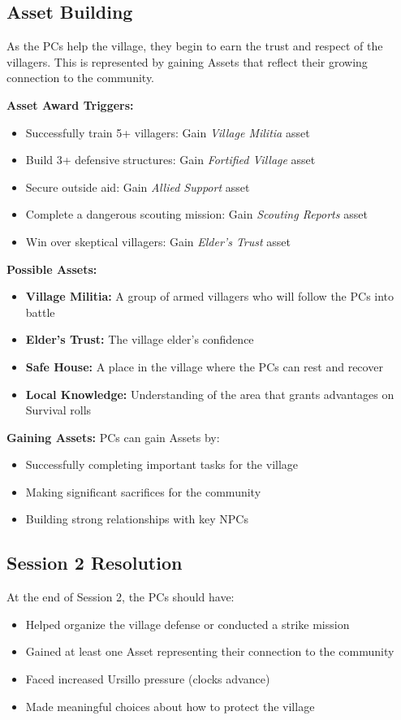 \documentclass[11pt]{article}
\begin{document}
\subsection{Asset Building}

As the PCs help the village, they begin to earn the trust and respect of the villagers. This is represented by gaining Assets that reflect their growing connection to the community.

\textbf{Asset Award Triggers:}
\begin{itemize}
\item Successfully train 5+ villagers: Gain \textit{Village Militia} asset
\item Build 3+ defensive structures: Gain \textit{Fortified Village} asset  
\item Secure outside aid: Gain \textit{Allied Support} asset
\item Complete a dangerous scouting mission: Gain \textit{Scouting Reports} asset
\item Win over skeptical villagers: Gain \textit{Elder's Trust} asset
\end{itemize}

\textbf{Possible Assets:}
\begin{itemize}
\item \textbf{Village Militia:} A group of armed villagers who will follow the PCs into battle
\item \textbf{Elder's Trust:} The village elder's confidence
\item \textbf{Safe House:} A place in the village where the PCs can rest and recover
\item \textbf{Local Knowledge:} Understanding of the area that grants advantages on Survival rolls
\end{itemize}

\textbf{Gaining Assets:} PCs can gain Assets by:
\begin{itemize}
\item Successfully completing important tasks for the village
\item Making significant sacrifices for the community
\item Building strong relationships with key NPCs
\end{itemize}

\subsection{Session 2 Resolution}

At the end of Session 2, the PCs should have:
\begin{itemize}
\item Helped organize the village defense or conducted a strike mission
\item Gained at least one Asset representing their connection to the community
\item Faced increased Ursillo pressure (clocks advance)
\item Made meaningful choices about how to protect the village
\end{itemize}
\end{document}
